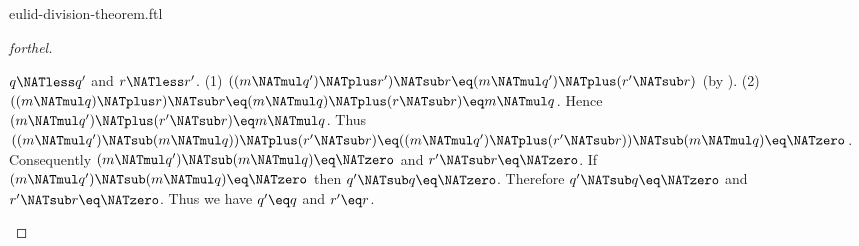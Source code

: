 \documentclass{naproche-library}
\begin{document}
\begin{smodule}[title=Euclid's Division Theorem]{eulid-division-theorem.ftl}
\begin{proof}[forthel]
  \begin{case}{$q \NATless q'$ and $r \NATless r'$.}
    (1) $((m \NATmul q') \NATplus r') \NATsub r \eq (m \NATmul q') \NATplus (r' \NATsub r)$ (by ).
    (2) $((m \NATmul q) \NATplus r) \NATsub r
      \eq (m \NATmul q) \NATplus (r \NATsub r)
      \eq m \NATmul q$.
    Hence $(m \NATmul q') \NATplus (r' \NATsub r) \eq m \NATmul q$.
    Thus $((m \NATmul q') \NATsub (m \NATmul q)) \NATplus (r' \NATsub r)
      \eq ((m \NATmul q') \NATplus (r' \NATsub r)) \NATsub (m \NATmul q)
      \eq \NATzero$.
    Consequently $(m \NATmul q') \NATsub (m \NATmul q) \eq \NATzero$ and $r' \NATsub r \eq \NATzero$.
    If $(m \NATmul q') \NATsub (m \NATmul q) \eq \NATzero$ then $q' \NATsub q \eq \NATzero$.
    Therefore $q' \NATsub q \eq \NATzero$ and $r' \NATsub r \eq \NATzero$.
    Thus we have $q' \eq q$ and $r' \eq r$.
  \end{case}
\end{proof}
\end{smodule}
\end{document}
